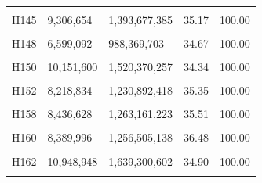 \documentclass[
  a4paper,
  titlepage]{article}
\begin{document}
\begin{longtable}[t]{lllll}
\cellcolor{gray!6}{H144} & \cellcolor{gray!6}{7,824,922} & \cellcolor{gray!6}{1,171,907,299} & \cellcolor{gray!6}{34.63} & \cellcolor{gray!6}{100.00}\\
 
H145 & 9,306,654 & 1,393,677,385 & 35.17 & 100.00\\
 
\cellcolor{gray!6}{H146} & \cellcolor{gray!6}{7,289,368} & \cellcolor{gray!6}{1,091,741,105} & \cellcolor{gray!6}{34.88} & \cellcolor{gray!6}{100.00}\\
 
H148 & 6,599,092 & 988,369,703 & 34.67 & 100.00\\
 
\cellcolor{gray!6}{H149} & \cellcolor{gray!6}{8,072,010} & \cellcolor{gray!6}{1,208,867,327} & \cellcolor{gray!6}{34.51} & \cellcolor{gray!6}{100.00}\\
 
H150 & 10,151,600 & 1,520,370,257 & 34.34 & 100.00\\
 
\cellcolor{gray!6}{H151} & \cellcolor{gray!6}{10,397,040} & \cellcolor{gray!6}{1,557,370,608} & \cellcolor{gray!6}{34.63} & \cellcolor{gray!6}{100.00}\\
 
H152 & 8,218,834 & 1,230,892,418 & 35.35 & 100.00\\
 
\cellcolor{gray!6}{H157} & \cellcolor{gray!6}{9,946,306} & \cellcolor{gray!6}{1,489,389,199} & \cellcolor{gray!6}{35.03} & \cellcolor{gray!6}{100.00}\\
 
H158 & 8,436,628 & 1,263,161,223 & 35.51 & 100.00\\
 
\cellcolor{gray!6}{H159} & \cellcolor{gray!6}{9,089,804} & \cellcolor{gray!6}{1,361,290,878} & \cellcolor{gray!6}{35.26} & \cellcolor{gray!6}{100.00}\\
 
H160 & 8,389,996 & 1,256,505,138 & 36.48 & 100.00\\
 
\cellcolor{gray!6}{H161} & \cellcolor{gray!6}{10,163,162} & \cellcolor{gray!6}{1,522,304,934} & \cellcolor{gray!6}{35.01} & \cellcolor{gray!6}{100.00}\\
 
H162 & 10,948,948 & 1,639,300,602 & 34.90 & 100.00\\
 
\cellcolor{gray!6}{H164} & \cellcolor{gray!6}{11,545,164} & \cellcolor{gray!6}{1,729,192,162} & \cellcolor{gray!6}{34.82} & \cellcolor{gray!6}{100.00}\\
 

\end{longtable}
\end{document}
